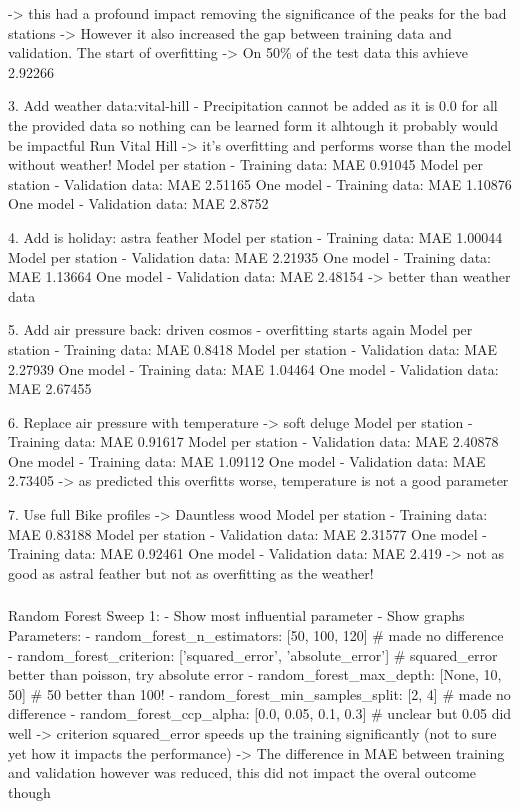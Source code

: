 \documentclass[a4paper]{article}
\begin{document}
    -> this had a profound impact removing the significance of the peaks for the bad stations
    -> However it also increased the gap between training data and validation. The start of overfitting
    -> On 50\% of the test data this avhieve 2.92266

    3. Add weather data:vital-hill
    - Precipitation cannot be added as it is 0.0 for all the provided data so nothing can be learned form it
    alhtough it probably would be impactful
    Run Vital Hill -> it's overfitting and performs worse than the model without weather!
    Model per station - Training data: MAE 0.91045
    Model per station - Validation data: MAE 2.51165
    One model - Training data: MAE 1.10876
    One model - Validation data: MAE 2.8752

    4. Add is holiday: astra feather
    Model per station - Training data: MAE 1.00044
    Model per station - Validation data: MAE 2.21935
    One model - Training data: MAE 1.13664
    One model - Validation data: MAE 2.48154
    -> better than weather data

    5. Add air pressure back: driven cosmos - overfitting starts again
    Model per station - Training data: MAE 0.8418
    Model per station - Validation data: MAE 2.27939
    One model - Training data: MAE 1.04464
    One model - Validation data: MAE 2.67455


    6. Replace air pressure with temperature -> soft deluge
    Model per station - Training data: MAE 0.91617
    Model per station - Validation data: MAE 2.40878
    One model - Training data: MAE 1.09112
    One model - Validation data: MAE 2.73405
    -> as predicted this overfitts worse, temperature is not a good parameter

    7. Use full Bike profiles -> Dauntless wood
    Model per station - Training data: MAE 0.83188
    Model per station - Validation data: MAE 2.31577
    One model - Training data: MAE 0.92461
    One model - Validation data: MAE 2.419
    -> not as good as astral feather but not as overfitting as the weather!


    \subsubsection*{}

    Random Forest Sweep 1:
    - Show most influential parameter
    - Show graphs
    Parameters:
    - random\_forest\_n\_estimators:  [50, 100, 120] \# made no difference
    - random\_forest\_criterion: ['squared\_error', 'absolute\_error']  \# squared\_error better than poisson, try absolute error
    - random\_forest\_max\_depth: [None, 10, 50]  \# 50 better than 100!
    - random\_forest\_min\_samples\_split: [2, 4] \# made no difference
    - random\_forest\_ccp\_alpha: [0.0, 0.05, 0.1, 0.3]  \# unclear but 0.05 did well
    -> criterion squared\_error speeds up the training significantly (not to sure yet how it impacts the performance)
    -> The difference in MAE between training and validation however was reduced, this did not impact the overal outcome though
\end{document}

